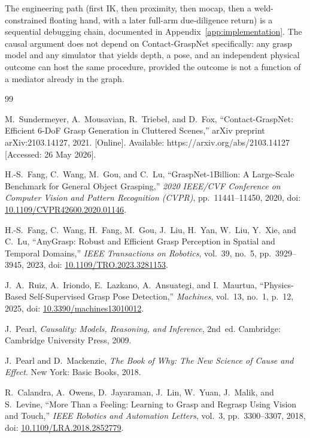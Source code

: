 \documentclass[11pt,a4paper]{report}
\begin{document}
The engineering path (first IK, then proximity, then mocap, then a weld-constrained floating hand, with a later full-arm due-diligence return) is a sequential debugging chain, documented in Appendix~\ref{app:implementation}. The causal argument does not depend on Contact-GraspNet specifically: any grasp model and any simulator that yields depth, a pose, and an independent physical outcome can host the same procedure, provided the outcome is not a function of a mediator already in the graph.


\begin{thebibliography}{99}

M.~Sundermeyer, A.~Mousavian, R.~Triebel, and D.~Fox,
``Contact-GraspNet: Efficient 6-DoF Grasp Generation in Cluttered Scenes,''
arXiv preprint arXiv:2103.14127, 2021. [Online]. Available: https://arxiv.org/abs/2103.14127
[Accessed: 26 May 2026].

H.-S.~Fang, C.~Wang, M.~Gou, and C.~Lu,
``GraspNet-1Billion: A Large-Scale Benchmark for General Object Grasping,''
\emph{2020 IEEE/CVF Conference on Computer Vision and Pattern Recognition (CVPR)}, pp.~11441--11450, 2020,
doi: \href{https://doi.org/10.1109/CVPR42600.2020.01146}{10.1109/CVPR42600.2020.01146}.

H.-S.~Fang, C.~Wang, H.~Fang, M.~Gou, J.~Liu, H.~Yan, W.~Liu, Y.~Xie, and C.~Lu,
``AnyGrasp: Robust and Efficient Grasp Perception in Spatial and Temporal Domains,''
\emph{IEEE Transactions on Robotics}, vol.~39, no.~5, pp.~3929--3945, 2023,
doi: \href{https://doi.org/10.1109/TRO.2023.3281153}{10.1109/TRO.2023.3281153}.

J.~A.~Ruiz, A.~Iriondo, E.~Lazkano, A.~Ansuategi, and I.~Maurtua,
``Physics-Based Self-Supervised Grasp Pose Detection,''
\emph{Machines}, vol.~13, no.~1, p.~12, 2025,
doi: \href{https://doi.org/10.3390/machines13010012}{10.3390/machines13010012}.

J.~Pearl,
\emph{Causality: Models, Reasoning, and Inference}, 2nd~ed.
Cambridge: Cambridge University Press, 2009.

J.~Pearl and D.~Mackenzie,
\emph{The Book of Why: The New Science of Cause and Effect}.
New York: Basic Books, 2018.

R.~Calandra, A.~Owens, D.~Jayaraman, J.~Lin, W.~Yuan, J.~Malik, and S.~Levine,
``More Than a Feeling: Learning to Grasp and Regrasp Using Vision and Touch,''
\emph{IEEE Robotics and Automation Letters}, vol.~3, pp.~3300--3307, 2018,
doi: \href{https://doi.org/10.1109/LRA.2018.2852779}{10.1109/LRA.2018.2852779}.


\end{thebibliography}
\end{document}

